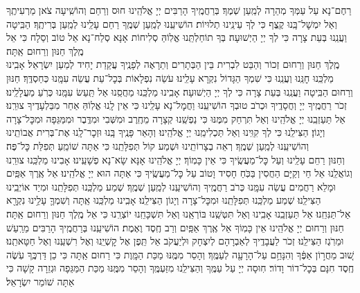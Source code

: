 \documentclass[twoside, openany, parskip=half, 11pt]{book}
\begin{document}
רַחֶם־נָא עַל עַמְּךָ מְהֵרָה לְמַֽעַן שְׁמֶךָ׃ בְּרַחֲמֶֽיךָ הָרַבִּים יְיָ אֱלֹהֵֽינוּ חוּס וְרַחֵם וְהוֹשִֽׁיעָה צֹאן מַרְעִיתֶֽךָ וְאַל יִמְשׇׁל־בָּֽנוּ קֶֽצֶף כִּי לְךָ עֵינֵֽינוּ תְלוּיוֹת׃ הוֹשִׁיעֵֽנוּ לְמַֽעַן שְׁמֶֽךָ רַחֵם עָלֵֽינוּ לְמַֽעַן בְּרִיתֶֽךָ׃ הַבִּֽיטָה וַעֲנֵֽנוּ בְּעֵת צָרָה כִּי לְךָ יְיָ הַיְשׁוּעָה׃ בְּךָ תוֹחַלְתֵּֽנוּ אֱלֽוֹהַּ סְלִיחוֹת אָנָּא סְלַח־נָא אֵל טוֹב וְסַלָח כִּי אֵל מֶֽלֶךְ חַנּוּן וְרַחוּם אַֽתָּה׃\\
מֶֽלֶךְ חַנּוּן וְרַחוּם זְכוֹר וְהַבֵּט לִבְרִית בֵּין הַבְּתָרִים וְתֵרָאֶה לְפָנֶֽיךָ עֲקֵדַת יָחִיד לְמַעַן יִשְׂרָאֵל׃ אָבִֽינוּ מַלְכֵּֽנוּ חׇנֵּֽנוּ וְעֲנֵֽנוּ כִּי שִׁמְךָ הַגָּדוֹל נִקְרָא עָלֵֽינוּ׃ עֹשֵׂה נִפְלָאוֹת בְּכׇל־עֵת עֲשֵׂה עִמָּֽנוּ כְּחַסְדֶּֽךָ׃ חַנּוּן וְרַחוּם הַבִּֽיטָה וַעֲנֵֽנוּ בְּעֵת צָרָה כִּי לְךָ יְיָ הַיְשׁוּעָה׃ אָבִֽינוּ מַלְכֵּֽנוּ מַחֲסֵֽנוּ אַל תַּֽעַשׂ עִמָּֽנוּ כְּרֹֽעַ מַעֲלָלֵֽינוּ׃ זְכֹר רַחֲמֶֽיךָ יְיָ וְחֲסָדֶֽיךָ וּכְרֹב טוּבְךָ הוֹשִׁיעֵֽנוּ וַחֲמׇל־נָא עָלֵֽינוּ כִּי אֵין לָֽנוּ אֱלֽוֹהַּ אַחֵר מִבַּלְעָדֶיךָ צוּרֵֽנוּ׃ אַל תַּעַזְבֵֽנוּ יְיָ אֱלֹהֵֽינוּ וְאַל תִּרְחַק מִמֶּנּוּ כִּי נַפְשֵֽׁנוּ קְצָרָה מֵחֶֽרֶב וּמִשְּׁבִי וּמִדֶּֽבֶר וּמִמַּגֵּפָה וּמִכׇּל־צָרָה וְיָגוֹן׃ הַצִּילֵֽנוּ כִּי לְךָ קִוִּֽינוּ וְאַל תַּכְלִימֵֽנוּ יְיָ אֱלֹהֵֽינוּ׃ וְהָאֵר פָּנֶֽיךָ בָּֽנוּ וּזְכׇר־לָֽנוּ אֶת־בְּרִית אֲבוֹתֵֽינוּ וְהוֹשִׁיעֵֽנוּ לְמַֽעַן שְׁמֶֽךָ׃ רְאֵה בְצָרוֹתֵֽינוּ וּשְׁמַע קוֹל תְּפִלָּתֵֽנוּ כִּי אַתָּה שׁוֹמֵֽעַ תְּפִלַּת כׇּל־פֶּה׃\\
וְחַנּוּן רַחֵם עָלֵֽינוּ וְעַל כׇּל־מַעֲשֶֽׂיךָ כִּי אֵין כָּמֽוֹךָ׃ יְיָ אֱלֹהֵֽינוּ אָנָּא שָׂא־נָא פְשָׁעֵֽינוּ׃ אָבִינוּ מַלְכֵּֽנוּ צוּרֵֽנוּ וְגוֹאֲלֵֽנוּ אֵל חַי וְקַיָּם הַחֲסִין בַּכֹּֽחַ חָסִיד וָטוֹב עַל כׇּל־מַעֲשֶֽׂיךָ כִּי אַתָּה הוּא יְיָ אֱלֹהֵֽינוּ׃ אֵל אֶֽרֶךְ אַפַּֽיִם וּמָלֵא רַחֲמִים עֲשֵׂה עִמָּֽנוּ כְּרֹב רַחֲמֶֽיךָ וְהוֹשִׁיעֵֽנוּ לְמַֽעַן שְׁמֶֽךָ׃ שְׁמַע מַלְכֵּֽנוּ תְּפִלָּתֵֽנוּ וּמִיַד אוֹיְבֵֽינוּ הַצִּילֵֽנוּ׃ שְׁמַע מַלְכֵּֽנוּ תְּפִלָּתֵֽנוּ וּמִכׇּל־צָרָה וְיָגוֹן הַצִּילֵֽנוּ׃ אָבִֽינוּ מַלְכֵּֽנוּ אַֽתָּה וְשִׁמְךָ֛ עָלֵ֥ינוּ נִקְרָ֖א אַל־תַּנִּחֵֽנוּ׃ אַל תַּעַזְבֵֽנוּ אָבִֽינוּ וְאַל תִּטְּשֵֽׁנוּ בּוֹרְאֵֽנוּ וְאַל תִּשְׁכָּחֵֽנוּ יוֹצְרֵֽנוּ כִּי אֵל מֶֽלֶךְ חַנּוּן וְרַחוּם אַֽתָּה׃\\
חַנּוּן וְרַחוּם יְיָ אֱלֹהֵֽינוּ אֵין כָּמֽוֹךָ אֵל אֶֽרֶךְ אַפַּֽיִם וְרַב חֶֽסֶד וֶאֶמֶת׃ הוֹשִׁיעֵֽנוּ בְּרַחֲמֶֽיךָ הָרַבִּים מֵרַֽעַשׁ וּמֵרֹֽגֶז הַצִּילֵֽנוּ׃ זְכֹר לַעֲבָדֶֽיךָ לְאַבְרָהָם לְיִצְחָק וּלְיַעֲקֹב אַל תֵּֽפֶן אֶל קׇשְׁיֵֽנוּ וְאֶל רִשְׁעֵֽנוּ וְאֶל חַטָּאתֵֽנוּ׃
שׁ֚וּב מֵחֲר֣וֹן אַפֶּ֔ךָ וְהִנָּחֵ֥ם עַל־הָרָעָ֖ה לְעַמֶּֽךָ׃ וְהָסֵר מִמֶּֽנּוּ מַכַּת הַמָּֽוֶת כִּי רַחוּם אַֽתָּה כִּי כֵן דַּרְכֶּֽךָ עֹֽשֶׂה חֶֽסֶד חִנָּם בְּכׇל־דוֹר וָדוֹר׃ חֽוּסָה יְיָ עַל עַמֶּֽךָ וְהַצִּילֵֽנוּ מִזַּעְמֶּֽךָ וְהָסֵר מִמֶּֽנּוּ מַכַּת הַמַּגֵּפָה וּגְזֵרָה קָשָׁה כִּי אַתָּה שׁוֹמֵר יִשְׂרָאֵל׃
\end{document}
